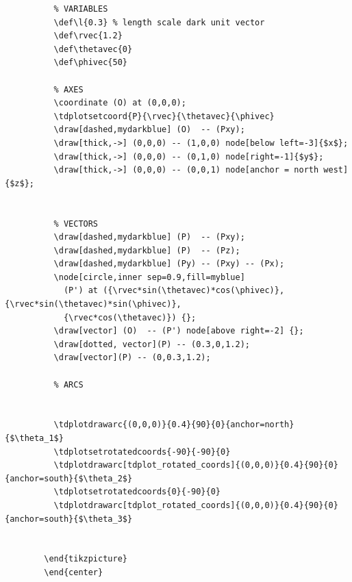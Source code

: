 \documentclass[letter, 10pts]{article}
\begin{document}
\begin{multicols}{2}
\begin{tiny}
\begin{verbatim}
		  % VARIABLES
		  \def\l{0.3} % length scale dark unit vector
		  \def\rvec{1.2}
		  \def\thetavec{0}
		  \def\phivec{50}
		  
		  % AXES
		  \coordinate (O) at (0,0,0);
		  \tdplotsetcoord{P}{\rvec}{\thetavec}{\phivec}
		  \draw[dashed,mydarkblue] (O)  -- (Pxy);
		  \draw[thick,->] (0,0,0) -- (1,0,0) node[below left=-3]{$x$};
		  \draw[thick,->] (0,0,0) -- (0,1,0) node[right=-1]{$y$};
		  \draw[thick,->] (0,0,0) -- (0,0,1) node[anchor = north west]{$z$};
		
		  
		  % VECTORS
		  \draw[dashed,mydarkblue] (P)  -- (Pxy);
		  \draw[dashed,mydarkblue] (P)  -- (Pz);
		  \draw[dashed,mydarkblue] (Py) -- (Pxy) -- (Px);
		  \node[circle,inner sep=0.9,fill=myblue]
			(P') at ({\rvec*sin(\thetavec)*cos(\phivec)},{\rvec*sin(\thetavec)*sin(\phivec)},
			{\rvec*cos(\thetavec)}) {};
		  \draw[vector] (O)  -- (P') node[above right=-2] {};
		  \draw[dotted, vector](P) -- (0.3,0,1.2);
		  \draw[vector](P) -- (0,0.3,1.2);
		  
		  % ARCS
		
		
		  \tdplotdrawarc{(0,0,0)}{0.4}{90}{0}{anchor=north}{$\theta_1$}
		  \tdplotsetrotatedcoords{-90}{-90}{0}
		  \tdplotdrawarc[tdplot_rotated_coords]{(0,0,0)}{0.4}{90}{0}{anchor=south}{$\theta_2$}
		  \tdplotsetrotatedcoords{0}{-90}{0}
		  \tdplotdrawarc[tdplot_rotated_coords]{(0,0,0)}{0.4}{90}{0}{anchor=south}{$\theta_3$}
		
		  
		\end{tikzpicture}
		\end{center}
\end{verbatim}
\end{tiny}\end{multicols}

\end{document}
